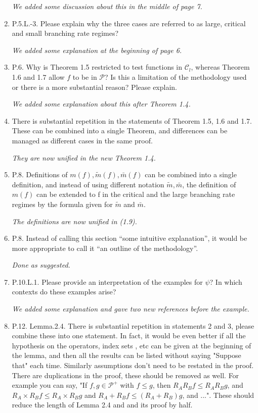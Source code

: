 \documentclass[12pt,a4paper]{amsart}
\begin{document}
\begin{enumerate}
  \emph{We added some discussion about this in the middle of page 7.}

\item
  P.5.L.-3.
  Please explain why the three cases are referred to as large, critical and small branching rate regimes?

  \emph{We added some explanation at the beginning of page 6.}
\item
  P.6.
  Why is Theorem 1.5 restricted to test functions in $\mathcal C_l$, whereas Theorem 1.6 and 1.7 allow $f$ to be in $\mathcal P$?
  Is this a limitation of the methodology used or there is a more substantial reason?
  Please explain.

  \emph{We added some explanation about this after Theorem 1.4.}
\item
  There is substantial repetition in the statements of Theorem 1.5, 1.6 and 1.7.
  These can be combined into a single Theorem, and differences can be managed as different cases in the same proof.

  \emph{They are now unified in the new Theorem 1.4.}
\item
  P.8.
  Definitions of $m(f ), \tilde m(f ), \bar m(f )$ can be combined into a single definition, and instead of using different notation $\tilde m, \bar m$, the definition of $m(f)$ can be extended to f in the critical and the large branching rate regimes by the formula given for $\tilde m$ and $\bar m$.

  \emph{The definitions are now unified in (1.9).}
\item
  P.8.
  Instead of calling this section ``some intuitive explanation'', it would be more appropriate to call it ``an outline of the methodology''.

  \emph{Done as suggested.}
\item
  P.10.L.1.
  Please provide an interpretation of the examples for $\psi$?
  In which contexts do these examples arise?

  \emph{We added some explanation and gave two new references before the example.}

\item
  P.12. Lemma.2.4.
  There is substantial repetition in statements 2 and 3, please combine these into one statement.
  In fact, it would be even better if all the hypothesis on the operators, index sets , etc can be given at the beginning of the lemma, and then all the results can be listed without saying "Suppose that" each time.
  Similarly assumptions don't need to be restated in the proof.
  There are duplications in the proof, these should be removed as well.
  For example you can say, "If $f,g \in \mathcal P^+$ with $f \leq g$, then $R_AR_Bf \leq R_AR_Bg$, and $R_A \times R_B f \leq R_A \times R_B g$ and $R_A +R_B f \leq (R_A +R_B)g$, and ...".
  These should reduce the length of Lemma 2.4 and and its proof by half.


\end{enumerate}
\end{document}
